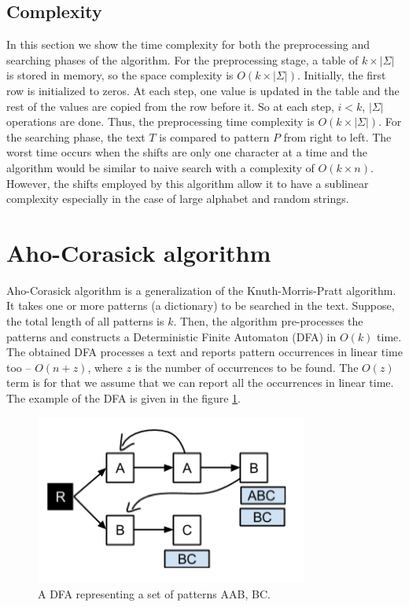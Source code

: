 \documentclass[paper=a4, fontsize=11pt]{scrartcl} %
\numberwithin{equation}{section} %
\numberwithin{figure}{section} %
\numberwithin{table}{section} %
\begin{document}
\subsection{Complexity}
\par In this section we show the time complexity for both the preprocessing and searching phases of the algorithm. For the preprocessing stage, a table of $k\times|\Sigma|$ is stored in memory, so the space complexity is $O(k\times|\Sigma|)$. Initially, the first row is initialized to zeros. At each step, one value is updated in the table and the rest of the values are copied from the row before it. So at each step, $i<k$, $|\Sigma|$ operations are done. Thus, the preprocessing time complexity is $O(k\times|\Sigma|)$. For the searching phase, the text $T$ is compared to pattern $P$ from right to left. The worst time occurs when the shifts are only one character at a time and the algorithm would be similar to naive search with a complexity of $O(k\times n)$. However, the shifts employed by this algorithm allow it to have a sublinear complexity especially in the case of large alphabet and random strings.

\newpage
\section{Aho-Corasick algorithm}
\par Aho-Corasick algorithm \cite{aho} is a generalization of the Knuth-Morris-Pratt algorithm. It takes one or more patterns (a dictionary) to be searched in the text. Suppose, the total length of all patterns is $k$. Then, the algorithm pre-processes the patterns and constructs a Deterministic Finite Automaton (DFA) \cite{hopcroft} in $O(k)$ time. The obtained DFA processes a text and reports pattern occurrences in linear time too -- $O(n + z)$, where $z$ is the number of occurrences to be found. The $O(z)$ term is for that we assume that we can report all the occurrences in linear time. The example of the DFA is given in the figure \ref{dfa}.

\begin{figure}[h!]
\centering
\includegraphics[width=0.8\textwidth]{figures/Example_DFA.png}
\caption{A DFA representing a set of patterns {AAB, BC}.}
\label{dfa}
\end{figure}
\end{document}

